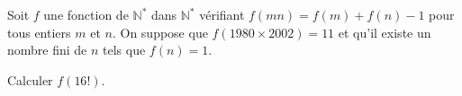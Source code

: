 Soit $f$ une fonction de $\mathbb{N}^*$ dans $\mathbb{N}^*$ vérifiant $f(mn) = f(m) + f(n) - 1$ pour tous entiers $m$ et $n$. On suppose que $f(1980 \times 2002) = 11$ et qu'il existe un nombre fini de $n$ tels que $f(n) = 1$.

Calculer $f(16!)$.
